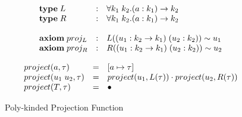 \[
\begin{array}{l c l}
    \textbf{type} \; L &: &\forall k_1 \; k_2. (a : k_1) \rightarrow k_2
    \\
    \textbf{type} \; R &: &\forall k_1 \; k_2. (a : k_1) \rightarrow k_2
    \\
    \\
    \textbf{axiom} \; proj_L &:& L((u_1 : k_2 \rightarrow k_1) \; (u_2 : k_2))
    \sim u_1
    \\
    \textbf{axiom} \; proj_R &:& R((u_1 : k_2 \rightarrow k_1) \; (u_2 : k_2))
    \sim u_2
\end{array}
\]
\begin{figure}
\[
\begin{array}{l c l}

    project(a, \tau) & = & [a \mapsto \tau]
    \\
    project(u_1 \; u_2, \tau) & = &
    project(u_1, L(\tau)) \cdot project(u_2, R(\tau))
    \\
    project(T, \tau) & = & \bullet
\end{array}
\]
\caption{Poly-kinded Projection Function}
\label{fig:poly-project}
\end{figure}
